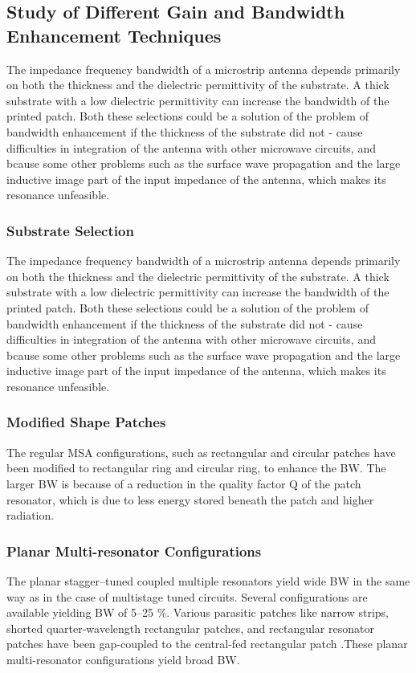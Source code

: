 \documentclass[12pt]{article}
\begin{document}
\subsection{Study of Different Gain and Bandwidth Enhancement Techniques}
\justify
The impedance frequency bandwidth of a microstrip antenna depends primarily on both the thickness and the dielectric permittivity of the substrate. A thick substrate with a low dielectric permittivity can increase the bandwidth of the printed patch. Both these selections could be a solution of the problem of bandwidth enhancement if the thickness of the substrate did not - cause difficulties in integration of the antenna with other microwave circuits, and  bcause some other problems such as the surface wave propagation and the large inductive image part of the input impedance of the antenna, which makes its resonance unfeasible.
  \subsubsection{ Substrate Selection}
   \justify
    The impedance frequency bandwidth of a microstrip antenna depends primarily on both the thickness and the dielectric permittivity of the substrate. A thick substrate with a low dielectric permittivity can increase the bandwidth of the printed patch. Both these selections could be a solution of the problem of bandwidth enhancement if the thickness of the substrate did not - cause difficulties in integration of the antenna with other microwave circuits, and  bcause some other problems such as the surface wave propagation and the large inductive image part of the input impedance of the antenna, which makes its resonance unfeasible.\\
 \subsubsection{Modified Shape Patches}
   \justify
    The regular MSA configurations, such as rectangular and circular patches have been modified to rectangular ring and circular ring, to enhance the BW. The larger BW is because of a reduction in the quality factor Q of the patch resonator, which is due to less energy stored beneath the patch and higher radiation.\\
  \subsubsection{ Planar Multi-resonator Configurations}
      \justify
     The planar stagger–tuned coupled multiple resonators yield wide BW in the same way as in the case of multistage tuned circuits. Several configurations are available yielding BW of 5–25 \%. Various parasitic patches like narrow strips, shorted quarter-wavelength rectangular patches, and rectangular resonator patches have been gap-coupled to the central-fed rectangular patch .These planar multi-resonator configurations yield broad BW.
\end{document}
